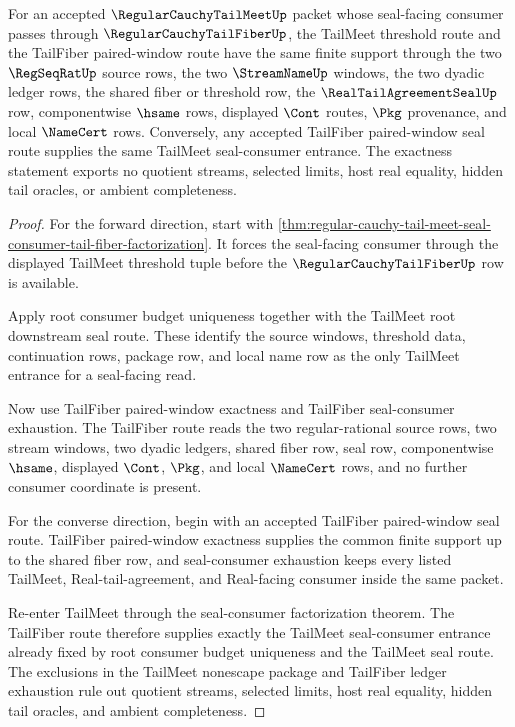 \begin{theorem}
\label{thm:regular-cauchy-tail-meet-tail-fiber-seal-exactness}
For an accepted $\RegularCauchyTailMeetUp$ packet whose seal-facing consumer
passes through $\RegularCauchyTailFiberUp$, the TailMeet threshold route and the
TailFiber paired-window route have the same finite support through the two
$\RegSeqRatUp$ source rows, the two $\StreamNameUp$ windows, the two dyadic
ledger rows, the shared fiber or threshold row, the
$\RealTailAgreementSealUp$ row, componentwise $\hsame$ rows, displayed $\Cont$
routes, $\Pkg$ provenance, and local $\NameCert$ rows. Conversely, any accepted
TailFiber paired-window seal route supplies the same TailMeet seal-consumer
entrance. The exactness statement exports no quotient streams, selected limits,
host real equality, hidden tail oracles, or ambient completeness.
\end{theorem}
\begin{proof}
For the forward direction, start with
\autoref{thm:regular-cauchy-tail-meet-seal-consumer-tail-fiber-factorization}.
It forces the seal-facing consumer through the displayed TailMeet threshold
tuple before the $\RegularCauchyTailFiberUp$ row is available.

Apply root consumer budget uniqueness together with the TailMeet root
downstream seal route. These identify the source windows, threshold data,
continuation rows, package row, and local name row as the only TailMeet entrance
for a seal-facing read.

Now use TailFiber paired-window exactness and TailFiber seal-consumer
exhaustion. The TailFiber route reads the two regular-rational source rows, two
stream windows, two dyadic ledgers, shared fiber row, seal row, componentwise
$\hsame$, displayed $\Cont$, $\Pkg$, and local $\NameCert$ rows, and no further
consumer coordinate is present.

For the converse direction, begin with an accepted TailFiber paired-window seal
route. TailFiber paired-window exactness supplies the common finite support up
to the shared fiber row, and seal-consumer exhaustion keeps every listed
TailMeet, Real-tail-agreement, and Real-facing consumer inside the same packet.

Re-enter TailMeet through the seal-consumer factorization theorem. The
TailFiber route therefore supplies exactly the TailMeet seal-consumer entrance
already fixed by root consumer budget uniqueness and the TailMeet seal route.
The exclusions in the TailMeet nonescape package and TailFiber ledger
exhaustion rule out quotient streams, selected limits, host real equality,
hidden tail oracles, and ambient completeness.
\end{proof}

